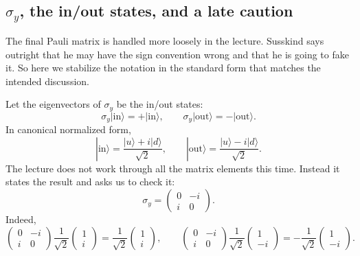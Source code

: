 \subsection{\(\sigma_y\), the in/out states, and a late caution}

The final Pauli matrix is handled more loosely in the lecture. Susskind says outright that he may have the sign convention wrong and that he is going to fake it. So here we stabilize the notation in the standard form that matches the intended discussion.

Let the eigenvectors of \(\sigma_y\) be the in/out states:
\begin{equation}
\sigma_y|\mathrm{in}\rangle=+|\mathrm{in}\rangle,
\qquad
\sigma_y|\mathrm{out}\rangle=-|\mathrm{out}\rangle.
\end{equation}
In canonical normalized form,
\begin{equation}
|\mathrm{in}\rangle=\frac{|u\rangle+i|d\rangle}{\sqrt2},
\qquad
|\mathrm{out}\rangle=\frac{|u\rangle-i|d\rangle}{\sqrt2}.
\end{equation}
The lecture does not work through all the matrix elements this time. Instead it states the result and asks us to check it:
\begin{equation}
\sigma_y=
\begin{pmatrix}
0 & -i \\
i & 0
\end{pmatrix}.
\end{equation}
Indeed,
\begin{equation}
\begin{pmatrix}
0 & -i \\
i & 0
\end{pmatrix}
\frac{1}{\sqrt2}
\begin{pmatrix}
1 \\
i
\end{pmatrix}
=
\frac{1}{\sqrt2}
\begin{pmatrix}
1 \\
i
\end{pmatrix},
\qquad
\begin{pmatrix}
0 & -i \\
i & 0
\end{pmatrix}
\frac{1}{\sqrt2}
\begin{pmatrix}
1 \\
-i
\end{pmatrix}
=
-
\frac{1}{\sqrt2}
\begin{pmatrix}
1 \\
-i
\end{pmatrix}.
\end{equation}

